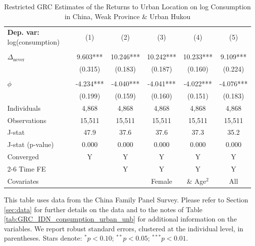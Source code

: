 \begin{table}[htbp] \centering \begin{threeparttable}
 \caption{Restricted GRC Estimates of the Returns to Urban Location on log Consumption in China, Weak Province & Urban Hukou} 
 \label{tab:GRC_CHN_w_urb_consumption_urban_unb} 
\begin{tabular}{l ccccc} \toprule  \textbf{Dep. var:}  log(consumption) 
                    &\multicolumn{1}{c}{(1)}   &\multicolumn{1}{c}{(2)}   &\multicolumn{1}{c}{(3)}   &\multicolumn{1}{c}{(4)}   &\multicolumn{1}{c}{(5)}   \\
                    &               &               &               &               &               \\
\addlinespace
$\Delta_{\text{never}}$&       9.603***&      10.246***&      10.242***&      10.233***&       9.109***\\
                    &     (0.315)   &     (0.183)   &     (0.187)   &     (0.160)   &     (0.224)   \\
                    &               &               &               &               &               \\
\addlinespace
$\phi$              &      -4.234***&      -4.040***&      -4.041***&      -4.022***&      -4.076***\\
                    &     (0.199)   &     (0.159)   &     (0.160)   &     (0.151)   &     (0.183)   \\
\addlinespace
Individuals         &       4,868   &       4,868   &       4,868   &       4,868   &       4,868   \\
Observations        &      15,511   &      15,511   &      15,511   &      15,511   &      15,511   \\
J-stat              &        47.9   &        37.6   &        37.6   &        37.3   &        35.2   \\
J-stat (p-value)    &       0.000   &       0.000   &       0.000   &       0.000   &       0.000   \\
Converged           &           Y   &           Y   &           Y   &           Y   &           Y   \\
\cmidrule{2-6} Time FE & & Y & Y & Y & Y \\ Covariates & & & Female & \& Age$^2$ & All \\ \bottomrule \end{tabular} \begin{tablenotes}[flushleft] \footnotesize \item{This table uses data from the China Family Panel Survey. Please refer to Section \ref{sec:data} for further details on the data and to the notes of Table \ref{tab:GRC_IDN_consumption_urban_unb} for additional information on the variables. We report robust standard errors, clustered at the individual level, in parentheses. Stars denote: $^{*} p<0.10$; $^{**} p<0.05$; $^{***} p<0.01$.} \end{tablenotes} \end{threeparttable} \end{table}
